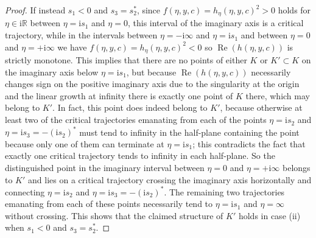 \documentclass[pdftex]{sigma}
\numberwithin{equation}{section}
\begin{document}
\begin{proof}
If instead $s_1<0$ and $s_3=s_2^*$, since $f(\eta,y,c)=h_\eta(\eta,y,c)^2>0$ holds for $\eta\in \mathrm{i} \mathbb{R}$ between $\eta=\mathrm{i} s_1$ and $\eta=0$, this interval of the imaginary axis is a critical trajectory, while in the intervals between $\eta=-\mathrm{i}\infty$ and $\eta=\mathrm{i} s_1$ and between $\eta=0$ and $\eta=+\mathrm{i}\infty$ we have $f(\eta,y,c)=h_\eta(\eta,y,c)^2<0$ so $\operatorname{Re}(h(\eta,y,c))$ is strictly monotone. This implies that there are no points of either $K$ or $K'\subset K$ on the imaginary axis below $\eta=\mathrm{i} s_1$, but because $\operatorname{Re}(h(\eta,y,c))$ necessarily changes sign on the positive imaginary axis due to the singularity at the origin and the linear growth at infinity there is exactly one point of $K$ there, which may belong to $K'$. In fact, this point does indeed belong to $K'$, because otherwise at least two of the critical trajectories emanating from each of the points $\eta=\mathrm{i} s_2$ and $\eta=\mathrm{i} s_3=-(\mathrm{i} s_2)^*$ must tend to infinity in the half-plane containing the point because only one of them can terminate at $\eta=\mathrm{i} s_1$; this contradicts the fact that exactly one critical trajectory tends to infinity in each half-plane. So the distinguished point in the imaginary interval between $\eta=0$ and $\eta=+\mathrm{i}\infty$ belongs to $K'$ and lies on a critical trajectory crossing the imaginary axis horizontally and connecting $\eta=\mathrm{i} s_2$ and $\eta=\mathrm{i} s_3=-(\mathrm{i} s_2)^*$. The remaining two trajectories emanating from each of these points necessarily tend to $\eta=\mathrm{i} s_1$ and $\eta=\infty$ without crossing. This shows that the claimed structure of $K'$ holds in case (ii) when $s_1<0$ and $s_3=s_2^*$.


\end{proof}
\end{document}
